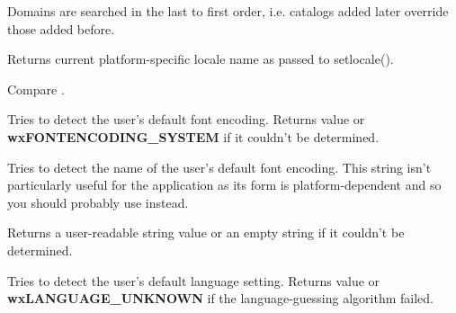 
Domains are searched in the last to first order, i.e. catalogs
added later override those added before.

\label{wxlocalegetsysname}


Returns current platform-specific locale name as passed to setlocale().

Compare .


\label{wxlocalegetsystemencoding}


Tries to detect the user's default font encoding.
Returns  value or 
{\bf wxFONTENCODING\_SYSTEM} if it couldn't be determined.

\label{wxlocalegetsystemencodingname}


Tries to detect the name of the user's default font encoding. This string isn't
particularly useful for the application as its form is platform-dependent and
so you should probably use 
 instead.

Returns a user-readable string value or an empty string if it couldn't be
determined.

\label{wxlocalegetsystemlanguage}


Tries to detect the user's default language setting.
Returns  value or 
 {\bf wxLANGUAGE\_UNKNOWN} if the language-guessing algorithm failed.


\label{wxlocaleinit}




